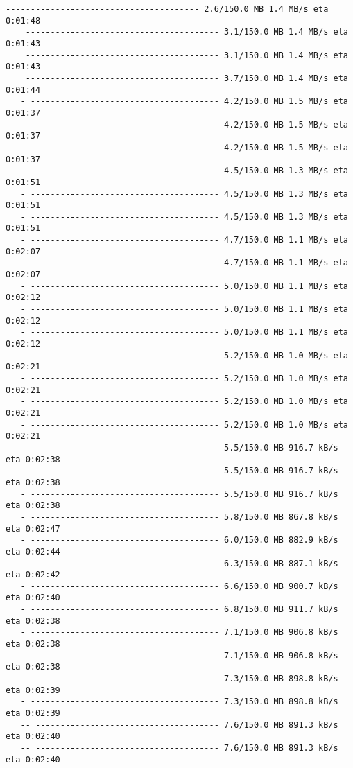 \documentclass[11pt]{article}
\begin{document}
\begin{Verbatim}[commandchars=\\\{\}]
    --------------------------------------- 2.6/150.0 MB 1.4 MB/s eta 0:01:48
    --------------------------------------- 3.1/150.0 MB 1.4 MB/s eta 0:01:43
    --------------------------------------- 3.1/150.0 MB 1.4 MB/s eta 0:01:43
    --------------------------------------- 3.7/150.0 MB 1.4 MB/s eta 0:01:44
   - -------------------------------------- 4.2/150.0 MB 1.5 MB/s eta 0:01:37
   - -------------------------------------- 4.2/150.0 MB 1.5 MB/s eta 0:01:37
   - -------------------------------------- 4.2/150.0 MB 1.5 MB/s eta 0:01:37
   - -------------------------------------- 4.5/150.0 MB 1.3 MB/s eta 0:01:51
   - -------------------------------------- 4.5/150.0 MB 1.3 MB/s eta 0:01:51
   - -------------------------------------- 4.5/150.0 MB 1.3 MB/s eta 0:01:51
   - -------------------------------------- 4.7/150.0 MB 1.1 MB/s eta 0:02:07
   - -------------------------------------- 4.7/150.0 MB 1.1 MB/s eta 0:02:07
   - -------------------------------------- 5.0/150.0 MB 1.1 MB/s eta 0:02:12
   - -------------------------------------- 5.0/150.0 MB 1.1 MB/s eta 0:02:12
   - -------------------------------------- 5.0/150.0 MB 1.1 MB/s eta 0:02:12
   - -------------------------------------- 5.2/150.0 MB 1.0 MB/s eta 0:02:21
   - -------------------------------------- 5.2/150.0 MB 1.0 MB/s eta 0:02:21
   - -------------------------------------- 5.2/150.0 MB 1.0 MB/s eta 0:02:21
   - -------------------------------------- 5.2/150.0 MB 1.0 MB/s eta 0:02:21
   - -------------------------------------- 5.5/150.0 MB 916.7 kB/s eta 0:02:38
   - -------------------------------------- 5.5/150.0 MB 916.7 kB/s eta 0:02:38
   - -------------------------------------- 5.5/150.0 MB 916.7 kB/s eta 0:02:38
   - -------------------------------------- 5.8/150.0 MB 867.8 kB/s eta 0:02:47
   - -------------------------------------- 6.0/150.0 MB 882.9 kB/s eta 0:02:44
   - -------------------------------------- 6.3/150.0 MB 887.1 kB/s eta 0:02:42
   - -------------------------------------- 6.6/150.0 MB 900.7 kB/s eta 0:02:40
   - -------------------------------------- 6.8/150.0 MB 911.7 kB/s eta 0:02:38
   - -------------------------------------- 7.1/150.0 MB 906.8 kB/s eta 0:02:38
   - -------------------------------------- 7.1/150.0 MB 906.8 kB/s eta 0:02:38
   - -------------------------------------- 7.3/150.0 MB 898.8 kB/s eta 0:02:39
   - -------------------------------------- 7.3/150.0 MB 898.8 kB/s eta 0:02:39
   -- ------------------------------------- 7.6/150.0 MB 891.3 kB/s eta 0:02:40
   -- ------------------------------------- 7.6/150.0 MB 891.3 kB/s eta 0:02:40

\end{Verbatim}
\end{document}
